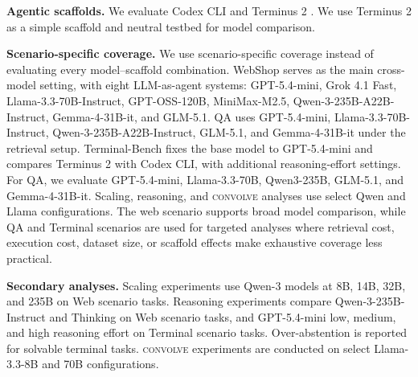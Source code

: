 \documentclass{article}
\newcommand{\method}{\textsc{convolve}\xspace}
\begin{document}
\vspace{-1mm}
\textbf{Agentic scaffolds.} We evaluate Codex CLI and Terminus 2 \cite{merrill2026terminal}. We use Terminus 2 as a simple scaffold and neutral testbed for model comparison.

\vspace{-1mm}
\textbf{Scenario-specific coverage.} We use scenario-specific coverage instead of evaluating every model--scaffold combination. WebShop serves as the main cross-model setting, with eight LLM-as-agent systems: GPT-5.4-mini, Grok 4.1 Fast, Llama-3.3-70B-Instruct, GPT-OSS-120B, MiniMax-M2.5, Qwen-3-235B-A22B-Instruct, Gemma-4-31B-it, and GLM-5.1. QA uses GPT-5.4-mini, Llama-3.3-70B-Instruct, Qwen-3-235B-A22B-Instruct, GLM-5.1, and Gemma-4-31B-it under the retrieval setup. Terminal-Bench fixes the base model to GPT-5.4-mini and compares Terminus 2 with Codex CLI, with additional reasoning-effort settings. For QA, we evaluate GPT-5.4-mini, Llama-3.3-70B, Qwen3-235B, GLM-5.1, and Gemma-4-31B-it. Scaling, reasoning, and \method analyses use select Qwen and Llama configurations. The web scenario supports broad model comparison, while QA and Terminal scenarios are used for targeted analyses where retrieval cost, execution cost, dataset size, or scaffold effects make exhaustive coverage less practical.

\vspace{-1mm}
\textbf{Secondary analyses.} Scaling experiments use Qwen-3 models at 8B, 14B, 32B, and 235B on Web scenario tasks. Reasoning experiments compare Qwen-3-235B-Instruct and Thinking on Web scenario tasks, and GPT-5.4-mini low, medium, and high reasoning effort on Terminal scenario tasks. Over-abstention is reported for solvable terminal tasks. \method experiments are conducted on select Llama-3.3-8B and 70B configurations.



\end{document}
